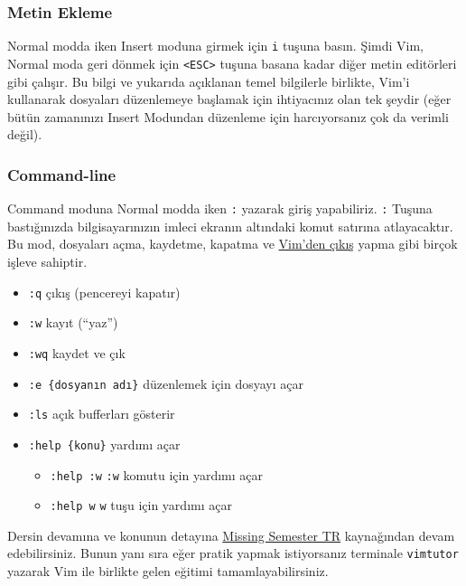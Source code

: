 \documentclass[
]{book}
\providecommand{\tightlist}{%
  \setlength{\itemsep}{0pt}\setlength{\parskip}{0pt}}
\begin{document}
\hypertarget{metin-ekleme}{%
\subsubsection*{Metin Ekleme}\label{metin-ekleme}}

Normal modda iken Insert moduna girmek için \texttt{i} tuşuna basın. Şimdi Vim, Normal moda geri dönmek için \texttt{\textless{}ESC\textgreater{}} tuşuna basana kadar diğer metin editörleri gibi çalışır. Bu bilgi ve yukarıda açıklanan temel bilgilerle birlikte, Vim'i kullanarak dosyaları düzenlemeye başlamak için ihtiyacınız olan tek şeydir (eğer bütün zamanınızı Insert Modundan düzenleme için harcıyorsanız çok da verimli değil).

\hypertarget{command-line}{%
\subsubsection*{Command-line}\label{command-line}}

Command moduna Normal modda iken \texttt{:} yazarak giriş yapabiliriz. \texttt{:} Tuşuna bastığınızda bilgisayarınızın imleci ekranın altındaki komut satırına atlayacaktır. Bu mod, dosyaları açma, kaydetme, kapatma ve \href{https://twitter.com/iamdevloper/status/435555976687923200}{Vim'den çıkış} yapma gibi birçok işleve sahiptir.

\begin{itemize}
\tightlist
\item
  \texttt{:q} çıkış (pencereyi kapatır)
\item
  \texttt{:w} kayıt (``yaz'')
\item
  \texttt{:wq} kaydet ve çık
\item
  \texttt{:e\ \{dosyanın\ adı\}} düzenlemek için dosyayı açar
\item
  \texttt{:ls} açık bufferları gösterir
\item
  \texttt{:help\ \{konu\}} yardımı açar

  \begin{itemize}
  \tightlist
  \item
    \texttt{:help\ :w} \texttt{:w} komutu için yardımı açar
  \item
    \texttt{:help\ w} \texttt{w} tuşu için yardımı açar
  \end{itemize}
\end{itemize}

Dersin devamına ve konunun detayına \href{https://missing-semester-tr.github.io/}{Missing Semester TR} kaynağından devam edebilirsiniz. Bunun yanı sıra eğer pratik yapmak istiyorsanız terminale \texttt{vimtutor} yazarak Vim ile birlikte gelen eğitimi tamamlayabilirsiniz.
\end{document}
